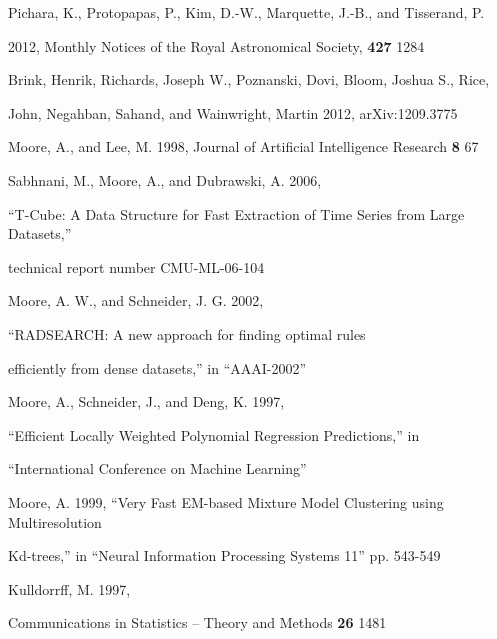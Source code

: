 \documentclass[prd,nofootbib,floatfix,11pt,tightenlines,nofootinbib]{revtex4}
\begin{document}
\begin{thebibliography}{99}

Pichara, K., Protopapas, P., Kim, D.-W., Marquette, J.-B., and Tisserand, P.

2012, Monthly Notices of the Royal Astronomical Society, {\bf 427} 1284




Brink, Henrik, Richards, Joseph W., Poznanski, Dovi, Bloom, Joshua S., Rice,

John, Negahban, Sahand, and Wainwright, Martin 2012, arXiv:1209.3775




Moore, A., and Lee, M. 1998, Journal of Artificial Intelligence Research {\bf 8} 67




Sabhnani, M., Moore, A., and Dubrawski, A. 2006,

``T-Cube: A Data Structure for Fast Extraction of Time Series from Large Datasets,''

technical report number CMU-ML-06-104




Moore, A. W., and Schneider, J. G. 2002, 

``RADSEARCH: A new approach for finding optimal rules

efficiently from dense datasets,'' in ``AAAI-2002''




Moore, A., Schneider, J., and Deng, K. 1997,

``Efficient Locally Weighted Polynomial Regression Predictions,'' in

``International Conference on Machine Learning''




Moore, A. 1999, ``Very Fast EM-based Mixture Model Clustering using Multiresolution

Kd-trees,'' in ``Neural Information Processing Systems 11''  pp. 543-549




Kulldorrff, M. 1997,

Communications in Statistics -- Theory and Methods {\bf 26} 1481






\end{thebibliography}
\end{document}
